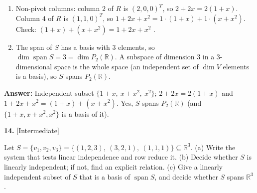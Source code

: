\documentclass[11pt]{article}
\begin{document}
\begin{tcolorbox}[breakable,colback=ans,colframe=ansb,boxrule=0.5pt,left=4pt,right=4pt,top=2pt,bottom=2pt]
\begin{enumerate}[leftmargin=3.1em,itemsep=1pt,topsep=1pt,label=\textbf{Step \arabic*.}]
\item Non-pivot columns: column $2$ of $R$ is $(2,0,0)^{T}$, so $2+2x=2(1+x)$. Column $4$ of $R$ is $(1,1,0)^{T}$, so $1+2x+x^{2}=1\cdot(1+x)+1\cdot(x+x^{2})$. Check: $(1+x)+(x+x^{2})=1+2x+x^{2}$ \checkmark.
\item The span of $S$ has a basis with $3$ elements, so $\dim\operatorname{span}S=3=\dim P_2(\mathbb{R})$. A subspace of dimension $3$ in a $3$-dimensional space is the whole space (an independent set of $\dim V$ elements is a basis), so $S$ spans $P_2(\mathbb{R})$.
\end{enumerate}\textbf{Answer:} Independent subset $\{1+x,\ x+x^{2},\ x^{2}\}$; $2+2x=2(1+x)$ and $1+2x+x^{2}=(1+x)+(x+x^{2})$. Yes, $S$ spans $P_2(\mathbb{R})$ (and $\{1+x,x+x^{2},x^{2}\}$ is a basis of it).\end{tcolorbox}
\par\vspace{2pt}
\begin{minipage}{\linewidth}\textbf{14.} \hfill{\scriptsize\color{ink}[Intermediate]}\par\nopagebreak Let $S=\{v_1,v_2,v_3\}=\{(1,2,3),\ (3,2,1),\ (1,1,1)\}\subseteq\mathbb{R}^{3}$. (a) Write the system that tests linear independence and row reduce it. (b) Decide whether $S$ is linearly independent; if not, find an explicit relation. (c) Give a linearly independent subset of $S$ that is a basis of $\operatorname{span}S$, and decide whether $S$ spans $\mathbb{R}^{3}$.
\end{minipage}\par\nopagebreak
\end{document}
